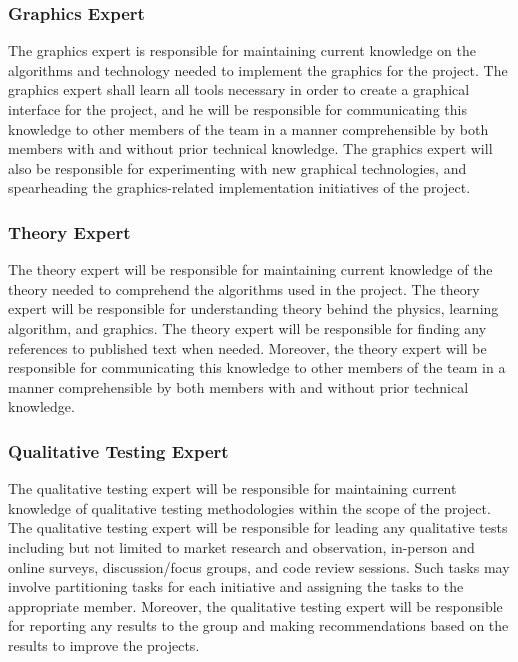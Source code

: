 \documentclass{article}
\begin{document}
\subsubsection{Graphics Expert}
The graphics expert is responsible for maintaining current knowledge on the 
algorithms and technology needed to implement the graphics for the project. The 
graphics expert shall learn all tools necessary in order to create a graphical 
interface for the project, and he will be responsible for communicating this 
knowledge to other members of the team in a manner comprehensible by both 
members with and without prior technical knowledge. The graphics expert will 
also be responsible for experimenting with new graphical technologies, and 
spearheading the graphics-related implementation initiatives of the project. 

\subsubsection{Theory Expert}
The theory expert will be responsible for maintaining current knowledge of the 
theory needed to comprehend the algorithms used in the project. The theory 
expert will be responsible for understanding theory behind the physics, learning 
algorithm, and graphics. The theory expert will be responsible for finding any 
references to published text when needed. Moreover, the theory expert will be 
responsible for communicating this knowledge to other members of the team in a 
manner comprehensible by both members with and without prior technical 
knowledge.

\subsubsection{Qualitative Testing Expert}
The qualitative testing expert will be responsible for maintaining current 
knowledge of qualitative testing methodologies within the scope of the project. 
The qualitative testing expert will be responsible for leading any qualitative 
tests including but not limited to market research and observation, in-person 
and online surveys, discussion/focus groups, and code review sessions. Such 
tasks may 
involve partitioning tasks for each initiative and assigning the tasks to the 
appropriate member. Moreover, the qualitative testing expert will be responsible 
for reporting any results to the group and making recommendations based on the 
results to improve the projects.
\end{document}

